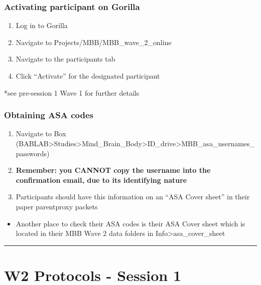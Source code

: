 \documentclass[]{book}
\providecommand{\tightlist}{%
  \setlength{\itemsep}{0pt}\setlength{\parskip}{0pt}}
\begin{document}
\hypertarget{activating-participant-on-gorilla-1}{%
\subsubsection{Activating participant on Gorilla}\label{activating-participant-on-gorilla-1}}

\begin{enumerate}
\def\labelenumi{\arabic{enumi}.}
\tightlist
\item
  Log in to Gorilla
\item
  Navigate to Projects/MBB/MBB\_wave\_2\_online
\item
  Navigate to the participants tab
\item
  Click ``Activate'' for the designated participant
\end{enumerate}

*see pre-session 1 Wave 1 for further details

\hypertarget{obtaining-asa-codes}{%
\subsubsection{Obtaining ASA codes}\label{obtaining-asa-codes}}

\begin{enumerate}
\def\labelenumi{\arabic{enumi}.}
\tightlist
\item
  Navigate to Box (BABLAB\textgreater{}Studies\textgreater{}Mind\_Brain\_Body\textgreater{}ID\_drive\textgreater{}MBB\_asa\_usernames\_passwords)
\item
  \textbf{Remember: you CANNOT copy the username into the confirmation email, due to its identifying nature}
\item
  Participants should have this information on an ``ASA Cover sheet'' in their paper parentproxy packets
\end{enumerate}

\begin{itemize}
\tightlist
\item
  Another place to check their ASA codes is their ASA Cover sheet which is located in their MBB Wave 2 data folders in Info\textgreater{}asa\_cover\_sheet
\end{itemize}

\begin{center}\rule{0.5\linewidth}{0.5pt}\end{center}

\hypertarget{w2-protocols---session-1}{%
\section{W2 Protocols - Session 1}\label{w2-protocols---session-1}}
\end{document}
